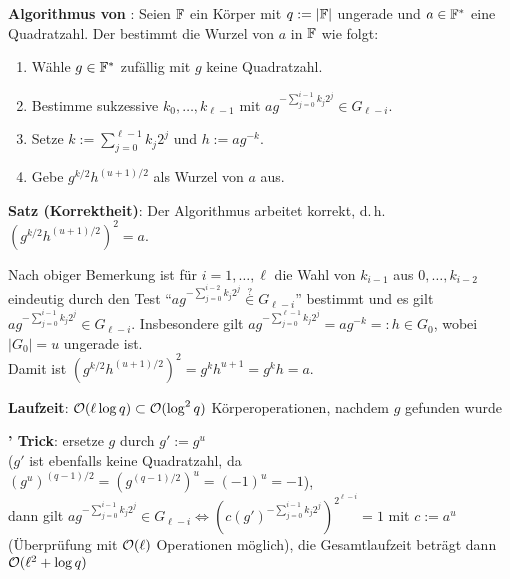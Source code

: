 \textbf{Algorithmus von }:
Seien $\mathbb{F}$ ein Körper mit $q := |\mathbb{F}|$ ungerade und $a \in \mathbb{F}^\ast$ eine Quadratzahl.
Der  bestimmt die Wurzel von $a$ in $\mathbb{F}$ wie folgt:
\begin{enumerate}
    \item
    Wähle $g \in \mathbb{F}^\ast$ zufällig mit $g$ keine Quadratzahl.
    
    \item
    Bestimme sukzessive $k_0, \dotsc, k_{\ell-1}$ mit
    $ag^{-\sum_{j=0}^{i-1} k_j 2^j} \in G_{\ell-i}$.
    
    \item
    Setze $k := \sum_{j=0}^{\ell-1} k_j 2^j$ und $h := ag^{-k}$.
    
    \item
    Gebe $g^{k/2} h^{(u+1)/2}$ als Wurzel von $a$ aus.
\end{enumerate}

\linie

\textbf{Satz (Korrektheit)}:
Der Algorithmus arbeitet korrekt, d.\,h. $(g^{k/2} h^{(u+1)/2})^2 = a$.

\begin{Beweis}
    Nach obiger Bemerkung ist für $i = 1, \dotsc, \ell$ die Wahl von $k_{i-1}$ aus
    $0, \dotsc, k_{i-2}$ eindeutig durch den Test
    "`$ag^{-\sum_{j=0}^{i-2} k_j 2^j} \overset{?}{\in} G_{\ell-i}$"' bestimmt
    und es gilt $ag^{-\sum_{j=0}^{i-1} k_j 2^j} \in G_{\ell-i}$.
    Insbesondere gilt
    $ag^{-\sum_{j=0}^{\ell-1} k_j 2^j} = ag^{-k} =: h \in G_0$,
    wobei $|G_0| = u$ ungerade ist.\\
    Damit ist $(g^{k/2} h^{(u+1)/2})^2 = g^k h^{u+1} = g^k h = a$.
\end{Beweis}

\linie

\textbf{Laufzeit}:
$\mathcal{O}(\ell \log q) \subset \mathcal{O}(\log^2 q)$ Körperoperationen, nachdem $g$ gefunden wurde

\textbf{' Trick}:
ersetze $g$ durch $g' := g^u$\\
($g'$ ist ebenfalls keine Quadratzahl, da
$(g^u)^{(q-1)/2} = (g^{(q-1)/2})^u = (-1)^u = -1$),\\
dann gilt $ag^{-\sum_{j=0}^{i-1} k_j 2^j} \in G_{\ell-i} \iff
(c (g')^{-\sum_{j=0}^{i-1} k_j 2^j})^{2^{\ell-i}} = 1$
mit $c := a^u$ (Überprüfung mit $\mathcal{O}(\ell)$ Operationen möglich),
die Gesamtlaufzeit beträgt dann $\mathcal{O}(\ell^2 + \log q)$

\pagebreak
